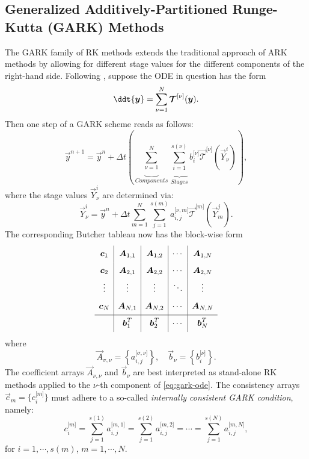 \documentclass{article}
\begin{document}
\subsection{Generalized Additively-Partitioned Runge-Kutta (GARK) Methods}
The GARK family of RK methods extends the traditional approach of ARK methods
by allowing for different stage values for the different components of the right-hand side.
Following \cite{sandu2015generalized}, suppose the ODE in question has
the form
\begin{equation}\label{eq:gark-ode}
\ddt{\vec{y}} = \sum_{\nu = 1}^{N} \vec{\mathcal{T}}^{\lbrack \nu\rbrack}(\vec{y}).
\end{equation}
Then one step of a GARK scheme reads as follows:
\begin{equation}
	\vec{y}^{n+1} = \vec{y}^n + \Delta t \left(
	\underbrace{\sum_{\nu = 1}^{N}}_{Components}
	\underbrace{\sum_{i = 1}^{s(\nu)}}_{Stages}
	b_i^{\lbrack \nu\rbrack} \vec{\mathcal{T}}^{\lbrack \nu\rbrack}(\vec{Y}^i_{\nu})
	\right),
\end{equation}
where the stage values $\vec{Y}^i_{\nu}$ are determined via:
\begin{equation}
	\vec{Y}^i_{\nu} = \vec{y}^n + \Delta t \sum_{m=1}^{N} \sum_{j=1}^{s(m)} a_{i, j}^{\lbrack \nu,m\rbrack}
	\vec{\mathcal{T}}^{\lbrack m\rbrack}(\vec{Y}^j_{m}).
\end{equation}
The corresponding Butcher tableau now has the block-wise form
\begin{equation}
	\begin{array}{c|c|c|c|c}
	\ST \vec{c}_{1} &\vec{A}_{1,1} &\vec{A}_{1,2} & \cdots & \vec{A}_{1,N}\\
	\ST \vec{c}_{2} &\vec{A}_{2,1} &\vec{A}_{2,2} & \cdots & \vec{A}_{2,N}\\
	\ST \vdots & \vdots & \vdots & \ddots & \vdots \\
	\ST \vec{c}_N & \vec{A}_{N,1} &\vec{A}_{N,2} & \cdots & \vec{A}_{N,N}\\
	\hline
	\ST  & \vec{b}_{1}^T & \vec{b}_{2}^T & \cdots & \vec{b}_{N}^T
	\end{array}
\end{equation}
where
\begin{equation}
	\vec{A}_{\sigma, \nu} = \left\lbrace a_{i, j}^{\lbrack \sigma, \nu \rbrack} \right\rbrace, \quad
	\vec{b}_{\nu} = \left\lbrace b_i^{\lbrack \nu \rbrack}\right\rbrace.
\end{equation}
The coefficient arrays $\vec{A}_{\nu, \nu}$ and $\vec{b}_{\nu}$ are best interpreted as stand-alone
RK methods applied to the $\nu$-th component of \eqref{eq:gark-ode}.
The consistency arrays $\vec{c}_m = \lbrace c_i^{\lbrack m \rbrack}\rbrace$
must adhere to a so-called \emph{internally consistent GARK condition},
namely:
\begin{equation}
	c_i^{\lbrack m \rbrack} = \sum_{j=1}^{s(1)} a_{i, j}^{\lbrack m, 1 \rbrack} =
	\sum_{j=1}^{s(2)} a_{i, j}^{\lbrack m, 2 \rbrack} = \cdots =
	\sum_{j=1}^{s(N)} a_{i, j}^{\lbrack m, N \rbrack},
\end{equation}
for $i = 1, \cdots, s(m)$, $m = 1, \cdots, N$.
\end{document}
